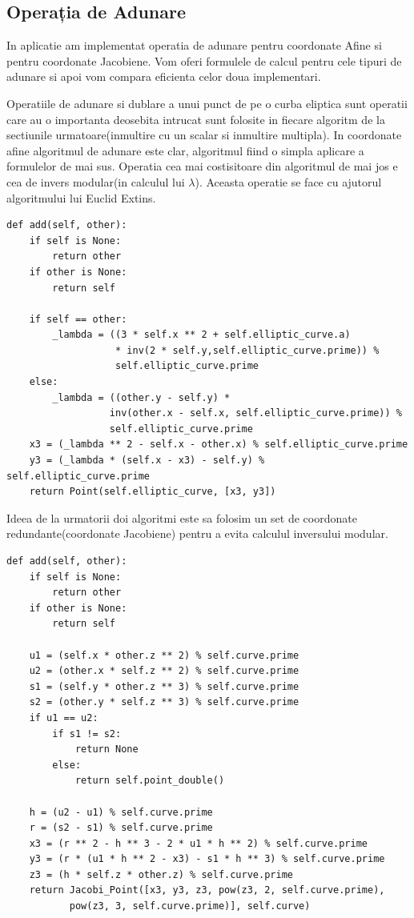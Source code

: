 \subsection{Operația de Adunare}
In aplicatie am implementat operatia de adunare pentru coordonate Afine si pentru coordonate Jacobiene. Vom oferi formulele de calcul pentru cele tipuri de adunare si apoi vom compara eficienta celor doua implementari.

Operatiile de adunare si dublare a unui punct de pe o curba eliptica sunt operatii care au o importanta deosebita intrucat sunt folosite in fiecare algoritm de la sectiunile urmatoare(inmultire cu un scalar si inmultire multipla).
In coordonate afine algoritmul de adunare este clar, algoritmul fiind o simpla aplicare a formulelor de mai sus. Operatia cea mai costisitoare din algoritmul de mai jos e cea de invers modular(in calculul lui $\lambda$). Aceasta operatie se face cu ajutorul algoritmului lui Euclid Extins.

\begin{lstlisting} 
def add(self, other):
	if self is None:
		return other
	if other is None:
		return self

	if self == other:
		_lambda = ((3 * self.x ** 2 + self.elliptic_curve.a) 
                   * inv(2 * self.y,self.elliptic_curve.prime)) % 
                   self.elliptic_curve.prime
	else:
		_lambda = ((other.y - self.y) * 
                  inv(other.x - self.x, self.elliptic_curve.prime)) %
                  self.elliptic_curve.prime
	x3 = (_lambda ** 2 - self.x - other.x) % self.elliptic_curve.prime
	y3 = (_lambda * (self.x - x3) - self.y) % self.elliptic_curve.prime
	return Point(self.elliptic_curve, [x3, y3])
\end{lstlisting}

Ideea de la urmatorii doi algoritmi  este sa folosim un set de coordonate redundante(coordonate Jacobiene) pentru a evita calculul inversului modular.

\begin{lstlisting}
def add(self, other):
    if self is None:
        return other
    if other is None:
        return self

    u1 = (self.x * other.z ** 2) % self.curve.prime
    u2 = (other.x * self.z ** 2) % self.curve.prime
    s1 = (self.y * other.z ** 3) % self.curve.prime
    s2 = (other.y * self.z ** 3) % self.curve.prime
    if u1 == u2:
        if s1 != s2:
            return None
        else:
            return self.point_double()

    h = (u2 - u1) % self.curve.prime
    r = (s2 - s1) % self.curve.prime
    x3 = (r ** 2 - h ** 3 - 2 * u1 * h ** 2) % self.curve.prime
    y3 = (r * (u1 * h ** 2 - x3) - s1 * h ** 3) % self.curve.prime
    z3 = (h * self.z * other.z) % self.curve.prime
    return Jacobi_Point([x3, y3, z3, pow(z3, 2, self.curve.prime), 
           pow(z3, 3, self.curve.prime)], self.curve)
\end{lstlisting}

